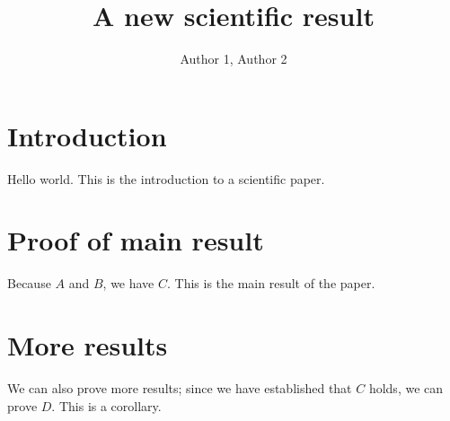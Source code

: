 \documentclass{article}
\begin{document}
\title{A new scientific result}
\author{Author 1, Author 2}
\maketitle

\section{Introduction}
\label{sec:intro}
Hello world. This is the introduction to a scientific paper.

\section{Proof of main result}
Because $A$ and $B$, we have $C$. This is the main result of the paper.

\section{More results}
We can also prove more results; since we have established that $C$ holds, we can prove $D$. This is a corollary.
\end{document}
